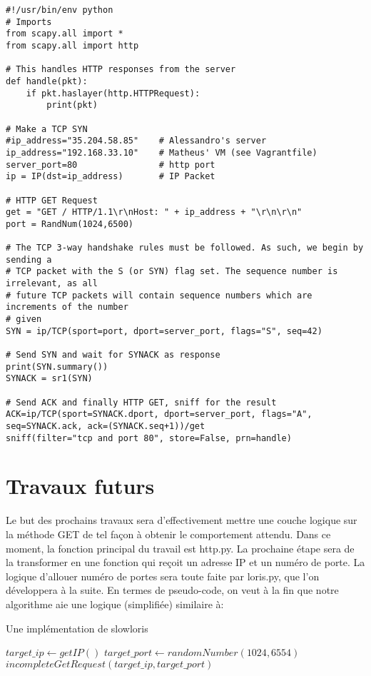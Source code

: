 \documentclass{article}
\begin{document}
\begin{lstlisting}
#!/usr/bin/env python
# Imports
from scapy.all import *
from scapy.all import http

# This handles HTTP responses from the server
def handle(pkt):
    if pkt.haslayer(http.HTTPRequest):
        print(pkt)
    
# Make a TCP SYN
#ip_address="35.204.58.85"    # Alessandro's server
ip_address="192.168.33.10"    # Matheus' VM (see Vagrantfile)
server_port=80                # http port
ip = IP(dst=ip_address)       # IP Packet 

# HTTP GET Request
get = "GET / HTTP/1.1\r\nHost: " + ip_address + "\r\n\r\n"
port = RandNum(1024,6500)

# The TCP 3-way handshake rules must be followed. As such, we begin by sending a
# TCP packet with the S (or SYN) flag set. The sequence number is irrelevant, as all
# future TCP packets will contain sequence numbers which are increments of the number
# given
SYN = ip/TCP(sport=port, dport=server_port, flags="S", seq=42) 

# Send SYN and wait for SYNACK as response
print(SYN.summary())
SYNACK = sr1(SYN)

# Send ACK and finally HTTP GET, sniff for the result
ACK=ip/TCP(sport=SYNACK.dport, dport=server_port, flags="A", seq=SYNACK.ack, ack=(SYNACK.seq+1))/get
sniff(filter="tcp and port 80", store=False, prn=handle)
\end{lstlisting}
\section{Travaux futurs}
Le but des prochains travaux sera d'effectivement mettre une couche logique sur la méthode GET de tel façon
à obtenir le comportement attendu. Dans ce moment, la fonction principal du travail est http.py. La prochaine
étape sera de la transformer en une fonction qui reçoit un adresse IP et un numéro de porte. La logique d'allouer
numéro de portes sera toute faite par loris.py, que l'on développera à la suite. En termes de pseudo-code, on veut
à la fin que notre algorithme aie une logique (simplifiée) similaire à:


\begin{algorithm}
\caption{Une implémentation de slowloris}
\begin{algorithmic}

\STATE $target\_ip \leftarrow getIP()$
\END
{}
\STATE $target\_port \leftarrow randomNumber(1024,6554)$
\STATE $incompleteGetRequest(target\_ip,target\_port)$
\ELSE

\ENDIF

\ENDWHILE
\end{algorithmic}
\end{algorithm}
\end{document}
